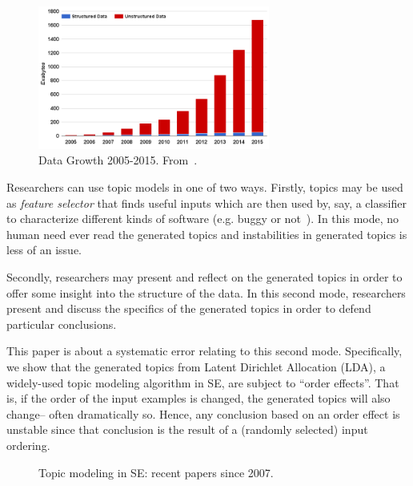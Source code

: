 \documentclass[10pt,conference]{IEEEtran}
\theoremstyle{break}
\begin{document}
\begin{figure}[!b]
  \captionsetup{justification=centering}
  \includegraphics[width=3in]{./fig/data.png}
  \caption{Data Growth 2005-2015. From~\cite{nadkarni2014structured}.}
  \label{fig: data}
\end{figure}


\noindent
Researchers can use topic models in one of two ways.
Firstly,
topics may be used as {\em feature selector} that finds useful inputs
which are then used by, say, a classifier to characterize different kinds of software (e.g. buggy or not~\cite{chen2016topic}).
In this mode, no human need ever read the generated topics and instabilities
in generated topics is less of an issue.

Secondly, researchers may present and reflect on the generated topics in order to
  offer some insight into the structure of the data.  In this second mode,
  researchers present and discuss the specifics of the generated topics in order
  to defend particular conclusions.

  This paper is about a 
  systematic error relating to this second mode.
  Specifically, we show that the generated topics from Latent Dirichlet
  Allocation (LDA), a widely-used topic modeling algorithm in SE, are subject to
  ``order effects''.  That is, if the order of the input examples is changed,
  the generated topics will also change-- often dramatically so.  Hence, any
  conclusion based on an order effect is unstable since that conclusion is the
  result of a (randomly selected) input ordering. 





\begin{figure}[!htbp]
  \centering
  \caption{Topic modeling in SE: recent papers since 2007.}
  \label{fig:survey1}
\end{figure}
\end{document}

